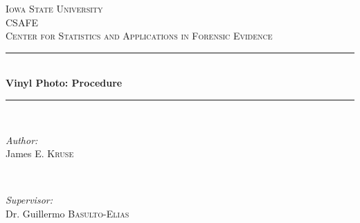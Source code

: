 \begin{titlepage}

\newcommand{\HRule}{\rule{\linewidth}{0.5mm}} %

\center %
 

\textsc{\LARGE Iowa State University}\\[1.5cm] %
\textsc{\Large CSAFE}\\[0.5cm] %
\textsc{\large Center for Statistics and Applications in Forensic Evidence }\\[0.5cm] %


\HRule \\[0.4cm]
{ \huge \bfseries Vinyl Photo: Procedure }\\[0.4cm] %
\HRule \\[1.5cm]
 

\begin{minipage}{0.4\textwidth}
\begin{flushleft} \large
\emph{Author:}\\
James \textsc{E. Kruse} %
\end{flushleft}
\end{minipage}
~
\begin{minipage}{0.4\textwidth}
\begin{flushright} \large
\emph{Supervisor:} \\
Dr. Guillermo \textsc{Basulto-Elias} %
\end{flushright}
\end{minipage}\\[2cm]



\end{titlepage}
